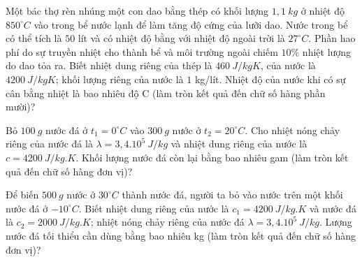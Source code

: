 \begin{ex}%
Một bác thợ rèn nhúng một con dao bằng thép có khối lượng $1,1\ kg$ ở nhiệt độ $850^\circ C$ vào trong bể nước lạnh để làm tăng độ cứng của lưỡi dao. Nước trong bể có thể tích là $50$ lít và có nhiệt độ bằng với nhiệt độ ngoài trời là $27^\circ C$. Phần hao phí do sự truyền nhiệt cho thành bể và môi trường ngoài chiếm $10\%$ nhiệt lượng do dao tỏa ra. Biết nhiệt dung riêng của thép là $460\ J/kgK$, của nước là $4200\ J/kgK$; khối lượng riêng của nước là $1$ kg/lít. Nhiệt độ của nước khi có sự cân bằng nhiệt là bao nhiêu độ C (làm tròn kết quả đến chữ số hàng phần mười)?
\end{ex}

\begin{ex}%
	Bỏ $100\ g$ nước đá ở $t_1 = 0^\circ C$ vào $300\ g$ nước ở $t_2 = 20^\circ C$. Cho nhiệt nóng chảy riêng của nước đá là $\lambda = 3,4.10^5\ J/kg$ và nhiệt dung riêng của nước là $c = 4200\ J/kg.K$. Khối lượng nước đá còn lại bằng bao nhiêu gam (làm tròn kết quả đến chữ số hàng đơn vị)?
\end{ex}

\begin{ex}%
	Để biến $500\ g$ nước ở $30^\circ C$ thành nước đá, người ta bỏ vào nước trên một khối nước đá ở $-10^\circ C$. Biết nhiệt dung riêng của nước là $c_1 = 4200\ J/kg.K$ và nước đá là $c_2 = 2000\ J/kg.K$; nhiệt nóng chảy riêng của nước đá $\lambda = 3,4.10^5 \ J/kg$. Lượng nước đá tối thiểu cần dùng bằng bao nhiêu kg (làm tròn kết quả đến chữ số hàng đơn vị)?
	
\end{ex}
